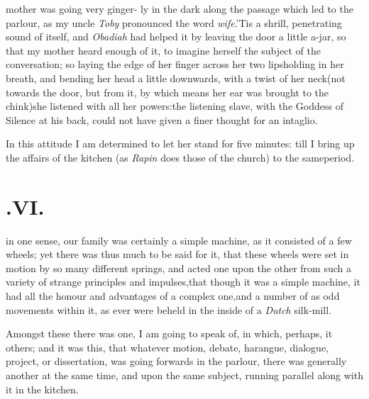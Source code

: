 \documentclass{article}
\begin{document}
 mother was going very ginger-\break
ly in the dark along the passage\break
which led to the parlour, as my uncle \textit{Toby}
pronounced the word \textit{wife}.\tsk ’Tis a shrill,
penetrating sound of itself, and \textit{Obadiah} had helped
it by leaving the door a little a-jar, so that my mother
heard enough of it, to imagine herself the subject of the
conversation; so laying the edge of her finger across her
two lips\tsk holding in her breath, and bending her head a
little downwards, with a twist of her neck\tsk (not towards
the door, but from it, by which means her ear was brought to
the chink)\tsk she listened with all her powers:\tsh the
listening slave, with the Goddess of Silence at his back,
could not have given a finer thought for an intaglio.

In this attitude I am determined to let her stand for five
minutes: till I bring up the affairs of the kitchen (as
\textit{Rapin} does those of the church) to the same\break period.

\section{.\enspace  VI.}

 in one sense, our family\break
was certainly a simple machine, as\break
it consisted of a few wheels; yet there\break
was thus much to be said for it, that
these wheels were set in motion by so many
different springs, and acted one upon the
other from such a variety of strange
principles and impulses,\tsh that though
it was a simple machine, it had all the
honour and advantages of a complex
one,\tsh and a number of as odd movements
within it, as ever were beheld in the
inside of a \textit{Dutch} silk-mill.

Amongst these there was one, I am going to speak of, in which,
perhaps, it
 others; and it
was this, that whatever motion, debate, harangue, dialogue,
pro\-ject, or dissertation, was going forwards in the parlour,
there was generally ano\-ther at the same time, and upon the
same subject, running parallel along with it in the kitchen.
\end{document}
